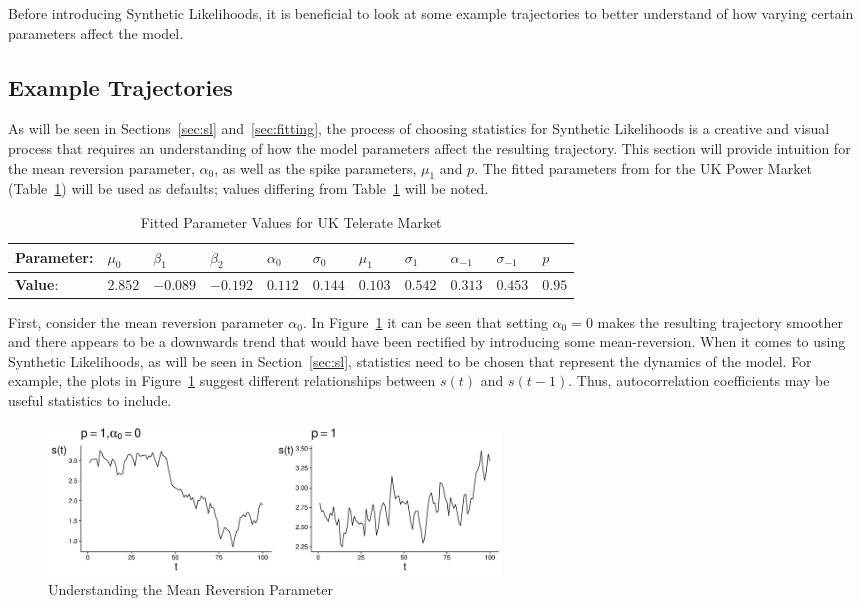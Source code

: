Before introducing Synthetic Likelihoods, it is beneficial to look at some example trajectories to better understand of how varying certain parameters affect the model.

\subsection{Example Trajectories}

As will be seen in Sections~\ref{sec:sl} and~\ref{sec:fitting}, the process of choosing statistics for Synthetic Likelihoods is a creative and visual process that requires an understanding of how the model parameters affect the resulting trajectory. This section will provide intuition for the mean reversion parameter, $\alpha_0$, as well as the spike parameters, $\mu_1$ and $p$. The fitted parameters from \cite{huisman_mahieu_2003} for the UK Power Market (Table~\ref{tab:uk-val}) will be used as defaults; values differing from Table~\ref{tab:uk-val} will be noted.

\begin{table}[H]
\caption{Fitted Parameter Values for UK
\label{tab:uk-val}
Telerate Market \citep{huisman_mahieu_2003}}
\begin{tabular}{@{}lllllllllll@{}}
\toprule
\textbf{Parameter}: & $\mu_0$ & $\beta_1$ & $\beta_2$ & $\alpha_0$ & $\sigma_0$ & $\mu_1$ & $\sigma_1$ & $\alpha_{-1}$ & $\sigma_{-1}$ & $p$  \\
\midrule
\textbf{Value}: & $2.852$   & $-0.089$    & $-0.192$    & $0.112$      & $0.144$      & $0.103$   & $0.542$      & $0.313$         & $0.453$         & $0.95$ \\
\bottomrule
\end{tabular}
\end{table}

First, consider the mean reversion parameter $\alpha_0$. In Figure~\ref{fig:mr_param} it can be seen that setting $\alpha_0 = 0$ makes the resulting trajectory smoother and there appears to be a downwards trend that would have been rectified by introducing some mean-reversion. When it comes to using Synthetic Likelihoods, as will be seen in Section~\ref{sec:sl}, statistics need to be chosen that represent the dynamics of the model. For example, the plots in Figure~\ref{fig:mr_param} suggest different relationships between $s(t)$ and $s(t-1)$. Thus, autocorrelation coefficients may be useful statistics to include.

\begin{figure}[H]
    \centering
    \includegraphics[width=12cm]{images/model/mean_reversion_example.pdf}
    \caption{Understanding the Mean Reversion Parameter}
    \label{fig:mr_param}
\end{figure}


